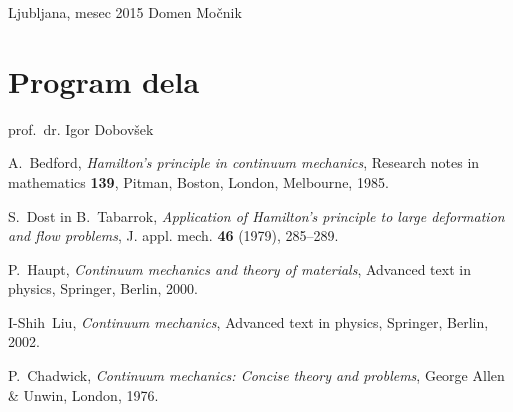 \documentclass[12pt,a4paper]{report}
\begin{document}
\null

\noindent Ljubljana, mesec 2015 \hfill Domen Močnik
\pagebreak

\tableofcontents
\pagebreak

\chapter*{Program dela}


\null

\noindent prof.~dr. Igor Dobovšek
\pagebreak


\pagebreak






\begin{thebibliography}{99}

A.~Bedford, \emph{Hamilton's principle in continuum mechanics}, Research notes in mathematics {\bf 139},
Pitman, Boston, London, Melbourne, 1985.

S.~Dost in B.~Tabarrok, \emph{Application of Hamilton's principle to large deformation and flow problems},
J. appl. mech. {\bf 46} (1979), 285--289.

P.~Haupt, \emph{Continuum mechanics and theory of materials}, Advanced text in physics,
Springer, Berlin, 2000.

I-Shih~Liu, \emph{Continuum mechanics}, Advanced text in physics,
Springer, Berlin, 2002.

P.~Chadwick, \emph{Continuum mechanics: Concise theory and problems},
George Allen \& Unwin, London, 1976.

\end{thebibliography}
\end{document}
